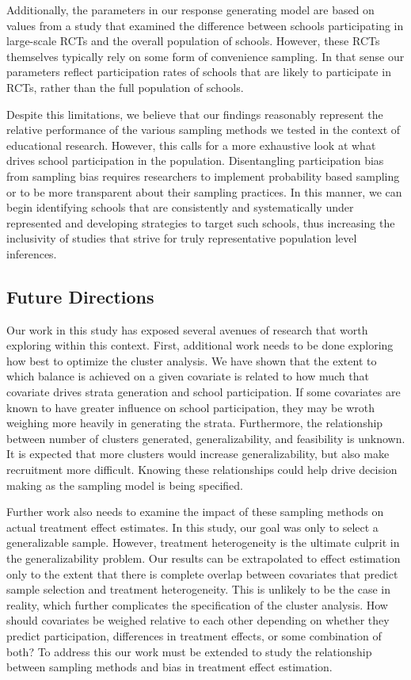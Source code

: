 \documentclass[man,floatsintext]{apa6}
\begin{document}
Additionally, the parameters in our response generating model are based on values from a study that examined the difference between schools participating in large-scale RCTs and the overall population of schools. However, these RCTs themselves typically rely on some form of convenience sampling. In that sense our parameters reflect participation rates of schools that are likely to participate in RCTs, rather than the full population of schools.

Despite this limitations, we believe that our findings reasonably represent the relative performance of the various sampling methods we tested in the context of educational research. However, this calls for a more exhaustive look at what drives school participation in the population. Disentangling participation bias from sampling bias requires researchers to implement probability based sampling or to be more transparent about their sampling practices. In this manner, we can begin identifying schools that are consistently and systematically under represented and developing strategies to target such schools, thus increasing the inclusivity of studies that strive for truly representative population level inferences.

\hypertarget{future-directions}{%
\subsection{Future Directions}\label{future-directions}}

Our work in this study has exposed several avenues of research that worth exploring within this context. First, additional work needs to be done exploring how best to optimize the cluster analysis. We have shown that the extent to which balance is achieved on a given covariate is related to how much that covariate drives strata generation and school participation. If some covariates are known to have greater influence on school participation, they may be wroth weighing more heavily in generating the strata. Furthermore, the relationship between number of clusters generated, generalizability, and feasibility is unknown. It is expected that more clusters would increase generalizability, but also make recruitment more difficult. Knowing these relationships could help drive decision making as the sampling model is being specified.

Further work also needs to examine the impact of these sampling methods on actual treatment effect estimates. In this study, our goal was only to select a generalizable sample. However, treatment heterogeneity is the ultimate culprit in the generalizability problem. Our results can be extrapolated to effect estimation only to the extent that there is complete overlap between covariates that predict sample selection and treatment heterogeneity. This is unlikely to be the case in reality, which further complicates the specification of the cluster analysis. How should covariates be weighed relative to each other depending on whether they predict participation, differences in treatment effects, or some combination of both? To address this our work must be extended to study the relationship between sampling methods and bias in treatment effect estimation.
\end{document}
